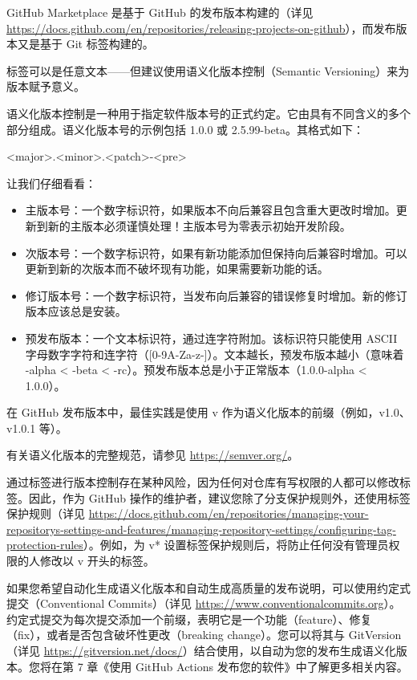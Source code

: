 GitHub Marketplace 是基于 GitHub 的发布版本构建的（详见 \url{https://docs.github.com/en/repositories/releasing-projects-on-github}），而发布版本又是基于 Git 标签构建的。

标签可以是任意文本——但建议使用语义化版本控制（Semantic Versioning）来为版本赋予意义。

语义化版本控制是一种用于指定软件版本号的正式约定。它由具有不同含义的多个部分组成。语义化版本号的示例包括 1.0.0 或 2.5.99-beta。其格式如下：

\begin{shell}
<major>.<minor>.<patch>-<pre>
\end{shell}

让我们仔细看看：

\begin{itemize}
\item 
主版本号：一个数字标识符，如果版本不向后兼容且包含重大更改时增加。更新到新的主版本必须谨慎处理！主版本号为零表示初始开发阶段。

\item 
次版本号：一个数字标识符，如果有新功能添加但保持向后兼容时增加。可以更新到新的次版本而不破坏现有功能，如果需要新功能的话。

\item 
修订版本号：一个数字标识符，当发布向后兼容的错误修复时增加。新的修订版本应该总是安装。

\item 
预发布版本：一个文本标识符，通过连字符附加。该标识符只能使用 ASCII 字母数字字符和连字符（[0-9A-Za-z-]）。文本越长，预发布版本越小（意味着 -alpha < -beta < -rc）。预发布版本总是小于正常版本（1.0.0-alpha < 1.0.0）。
\end{itemize}


在 GitHub 发布版本中，最佳实践是使用 v 作为语义化版本的前缀（例如，v1.0、v1.0.1 等）。

有关语义化版本的完整规范，请参见 \url{https://semver.org/}。


通过标签进行版本控制存在某种风险，因为任何对仓库有写权限的人都可以修改标签。因此，作为 GitHub 操作的维护者，建议您除了分支保护规则外，还使用标签保护规则（详见 \url{https://docs.github.com/en/repositories/managing-your-repositorys-settings-and-features/managing-repository-settings/configuring-tag-protection-rules}）。例如，为 v* 设置标签保护规则后，将防止任何没有管理员权限的人修改以 v 开头的标签。

如果您希望自动化生成语义化版本和自动生成高质量的发布说明，可以使用约定式提交（Conventional Commits）（详见 \url{https://www.conventionalcommits.org}）。约定式提交为每次提交添加一个前缀，表明它是一个功能（feature）、修复（fix），或者是否包含破坏性更改（breaking change）。您可以将其与 GitVersion（详见 \url{https://gitversion.net/docs/}）结合使用，以自动为您的发布生成语义化版本。您将在第 7 章《使用 GitHub Actions 发布您的软件》中了解更多相关内容。